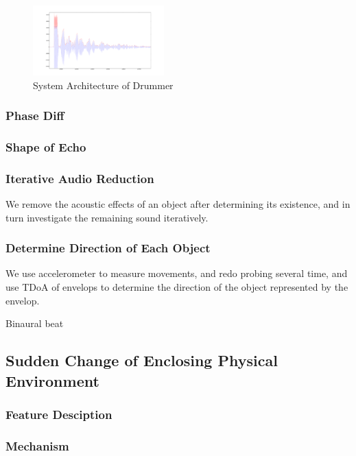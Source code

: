 \begin{figure}[H]
\centering
\includegraphics[width=0.45\textwidth]{./fig/inroom.pdf}
\caption{System Architecture of Drummer}
\end{figure}



\subsubsection{Phase Diff}



\subsubsection{Shape of Echo}



\subsubsection{Iterative Audio Reduction}

We remove the acoustic effects of an object after determining its existence, and 
in turn investigate the remaining sound iteratively. 


\subsubsection{Determine Direction of Each Object}

We use accelerometer to measure movements, and redo probing several time, and 
use TDoA of envelops to determine the direction of the object represented by the envelop.


Binaural beat


\subsection{Sudden Change of Enclosing Physical Environment}

\subsubsection{Feature Desciption}

\subsubsection{Mechanism}

